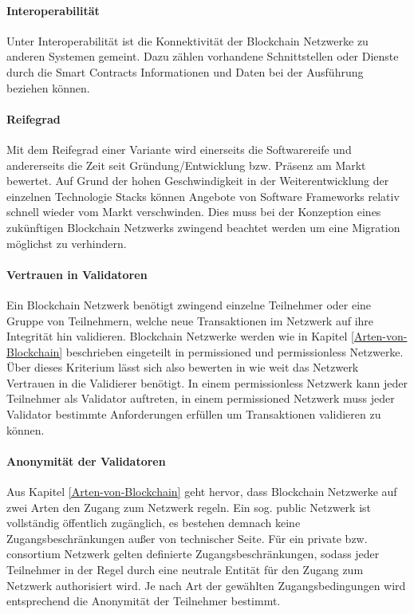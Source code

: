 \paragraph{Interoperabilität}
Unter Interoperabilität ist die Konnektivität der Blockchain Netzwerke zu anderen Systemen gemeint. Dazu zählen vorhandene Schnittstellen oder Dienste durch die Smart Contracts Informationen und Daten bei der Ausführung beziehen können. 

\paragraph{Reifegrad}
Mit dem Reifegrad einer Variante wird einerseits die Softwarereife und andererseits die Zeit seit Gründung/Entwicklung bzw. Präsenz am Markt bewertet. Auf Grund der hohen Geschwindigkeit in der Weiterentwicklung der einzelnen Technologie \glqq Stacks \grqq{} können Angebote von Software Frameworks relativ schnell wieder vom Markt verschwinden. Dies muss bei der Konzeption eines zukünftigen Blockchain Netzwerks zwingend beachtet werden um eine Migration möglichst zu verhindern.

\paragraph{Vertrauen in Validatoren}
Ein Blockchain Netzwerk benötigt zwingend einzelne Teilnehmer oder eine Gruppe von Teilnehmern, welche neue Transaktionen im Netzwerk auf ihre Integrität hin validieren. Blockchain Netzwerke werden wie in Kapitel \ref{Arten-von-Blockchain} beschrieben eingeteilt in permissioned und permissionless Netzwerke. Über dieses Kriterium lässt sich also bewerten in wie weit das Netzwerk Vertrauen in die Validierer benötigt. In einem permissionless Netzwerk kann jeder Teilnehmer als Validator auftreten, in einem permissioned Netzwerk muss jeder Validator bestimmte Anforderungen erfüllen um Transaktionen validieren zu können.

\paragraph{Anonymität der Validatoren}
Aus Kapitel \ref{Arten-von-Blockchain} geht hervor, dass Blockchain Netzwerke auf zwei Arten den Zugang zum Netzwerk regeln. Ein sog. public Netzwerk ist vollständig öffentlich zugänglich, es bestehen demnach keine Zugangsbeschränkungen außer von technischer Seite. Für ein private bzw. consortium Netzwerk gelten definierte Zugangsbeschränkungen, sodass jeder Teilnehmer in der Regel durch eine neutrale Entität für den Zugang zum Netzwerk authorisiert wird. Je nach Art der gewählten Zugangsbedingungen wird entsprechend die Anonymität der Teilnehmer bestimmt.

